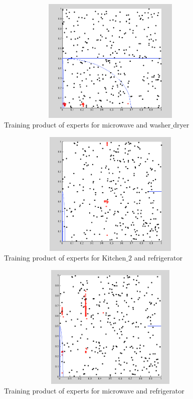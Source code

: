 \documentclass[letterpaper]{article}
\begin{document}
\begin{figure}[th]
\centering
\includegraphics[width=14cm,height=6cm]{channel_6_7.png}
\caption{Training product of experts for microwave and washer$\_$dryer}
\label{fig:img1}
\end{figure}

\begin{figure}[th]
\centering
\includegraphics[width=14cm,height=6cm]{channel_8_9.png}
\caption{Training product of experts for Kitchen$\_2$ and refrigerator}
\label{fig:img2}
\end{figure}

\begin{figure}[th]
\centering
\includegraphics[width=14cm,height=6cm]{channel_6_9.png}
\caption{Training product of experts for microwave and refrigerator}
\label{fig:img3}
\end{figure}





\end{document}
